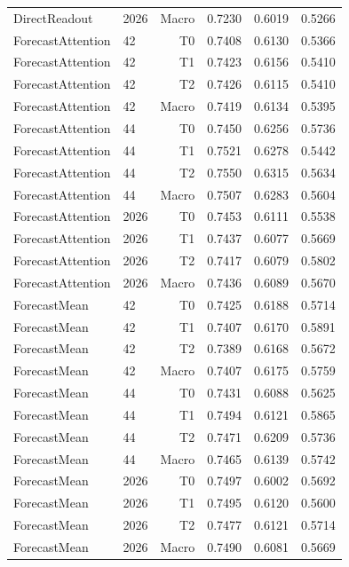 \begin{table}[t]
\begin{tabular}{llrrrr}
DirectReadout & 2026 & Macro & 0.7230 & 0.6019 & 0.5266 \\
ForecastAttention & 42 & T0 & 0.7408 & 0.6130 & 0.5366 \\
ForecastAttention & 42 & T1 & 0.7423 & 0.6156 & 0.5410 \\
ForecastAttention & 42 & T2 & 0.7426 & 0.6115 & 0.5410 \\
ForecastAttention & 42 & Macro & 0.7419 & 0.6134 & 0.5395 \\
ForecastAttention & 44 & T0 & 0.7450 & 0.6256 & 0.5736 \\
ForecastAttention & 44 & T1 & 0.7521 & 0.6278 & 0.5442 \\
ForecastAttention & 44 & T2 & 0.7550 & 0.6315 & 0.5634 \\
ForecastAttention & 44 & Macro & 0.7507 & 0.6283 & 0.5604 \\
ForecastAttention & 2026 & T0 & 0.7453 & 0.6111 & 0.5538 \\
ForecastAttention & 2026 & T1 & 0.7437 & 0.6077 & 0.5669 \\
ForecastAttention & 2026 & T2 & 0.7417 & 0.6079 & 0.5802 \\
ForecastAttention & 2026 & Macro & 0.7436 & 0.6089 & 0.5670 \\
ForecastMean & 42 & T0 & 0.7425 & 0.6188 & 0.5714 \\
ForecastMean & 42 & T1 & 0.7407 & 0.6170 & 0.5891 \\
ForecastMean & 42 & T2 & 0.7389 & 0.6168 & 0.5672 \\
ForecastMean & 42 & Macro & 0.7407 & 0.6175 & 0.5759 \\
ForecastMean & 44 & T0 & 0.7431 & 0.6088 & 0.5625 \\
ForecastMean & 44 & T1 & 0.7494 & 0.6121 & 0.5865 \\
ForecastMean & 44 & T2 & 0.7471 & 0.6209 & 0.5736 \\
ForecastMean & 44 & Macro & 0.7465 & 0.6139 & 0.5742 \\
ForecastMean & 2026 & T0 & 0.7497 & 0.6002 & 0.5692 \\
ForecastMean & 2026 & T1 & 0.7495 & 0.6120 & 0.5600 \\
ForecastMean & 2026 & T2 & 0.7477 & 0.6121 & 0.5714 \\
ForecastMean & 2026 & Macro & 0.7490 & 0.6081 & 0.5669 \\
\bottomrule
\end{tabular}
\end{table}
